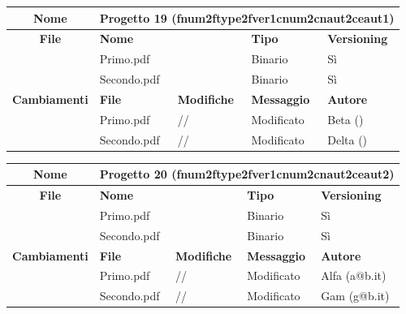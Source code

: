 \begin{table}[ht]
\footnotesize
\begin{tabular}{|c|p{2.5cm}|p{2cm}|p{2.5cm}|p{2.5cm}|}
  \hline
  \textbf{Nome}	& \multicolumn{4}{l|}{Progetto 19 (fnum2ftype2fver1cnum2cnaut2ceaut1)} 									\\
  \hline
  \rowcolor{lightgray}\textbf{File} 		& \multicolumn{2}{l|}{\textbf{Nome}}		& \textbf{Tipo}		& \textbf{Versioning} 		\\
						\cline{2-5}
						& \multicolumn{2}{l|}{Primo.pdf}		& Binario		& Sì				\\
						\cline{2-5}
						& \multicolumn{2}{l|}{Secondo.pdf}		& Binario		& Sì				\\
  \hline
  \rowcolor{lightgray}\textbf{Cambiamenti}	& \textbf{File}		&\textbf{Modifiche}	& \textbf{Messaggio}	& \textbf{Autore}		\\
						\cline{2-5}
						& Primo.pdf		& //	  		& Modificato		& Beta ()			\\
						\cline{2-5}
						& Secondo.pdf		& //	  		& Modificato		& Delta ()			\\
  \hline
\end{tabular}
\end{table}

\begin{table}[ht]
\footnotesize
\begin{tabular}{|c|p{2.5cm}|p{2cm}|p{2.5cm}|p{2.5cm}|}
  \hline
  \textbf{Nome}	& \multicolumn{4}{l|}{Progetto 20 (fnum2ftype2fver1cnum2cnaut2ceaut2)} 									\\
  \hline
  \rowcolor{lightgray}\textbf{File} 		& \multicolumn{2}{l|}{\textbf{Nome}}		& \textbf{Tipo}		& \textbf{Versioning} 		\\
						\cline{2-5}
						& \multicolumn{2}{l|}{Primo.pdf}		& Binario		& Sì				\\
						\cline{2-5}
						& \multicolumn{2}{l|}{Secondo.pdf}		& Binario		& Sì				\\
  \hline
  \rowcolor{lightgray}\textbf{Cambiamenti}	& \textbf{File}		&\textbf{Modifiche}	& \textbf{Messaggio}	& \textbf{Autore}		\\
						\cline{2-5}
						& Primo.pdf		& //	  		& Modificato		& Alfa (a@b.it)			\\
						\cline{2-5}
						& Secondo.pdf		& //	  		& Modificato		& Gam (g@b.it)			\\
						
  \hline
\end{tabular}
\end{table}



